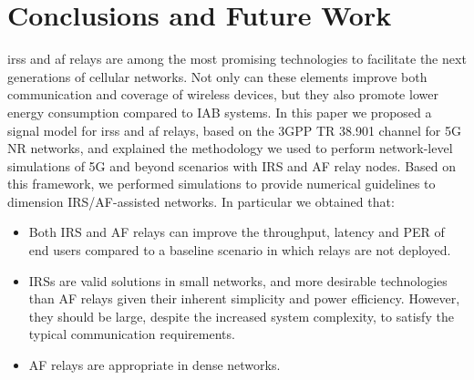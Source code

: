 \section{Conclusions and Future Work}
\label{sec:conclusion}
\Glspl{irs} and \gls{af} relays are among the most promising technologies to facilitate the next generations of cellular networks.
Not only can these elements improve both communication and coverage of wireless devices, but they also promote lower energy consumption compared to IAB systems.
In this paper we proposed a signal model for \glspl{irs} and \gls{af} relays, based on the 3GPP TR 38.901 channel for 5G NR networks, and explained the methodology we used to perform network-level simulations of 5G and beyond scenarios with IRS and AF relay nodes.
Based on this framework, we performed simulations to provide numerical guidelines to dimension IRS/AF-assisted networks. In particular we obtained that:
\begin{itemize}
	\item Both IRS and AF relays can improve the throughput, latency and PER of end users compared to a baseline scenario in which relays are not deployed.
	\item IRSs are valid solutions in small networks, and more desirable technologies than AF relays given their inherent simplicity and power efficiency. However, they should be large, despite the increased system complexity, to satisfy the typical communication requirements.
	\item AF relays are appropriate in dense networks.
\end{itemize}
	